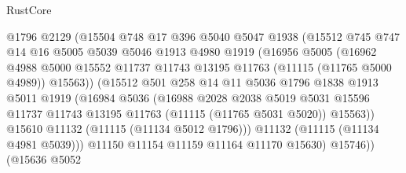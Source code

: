 \begin{lexlean}{RustCore}
\begin{coremodule}
                        @1796
                        @2129
                        (@15504
                          @748
                          @17
                          @396
                          @5040
                          @5047
                          @1938
                          (@15512
                            @745
                            @747
                            @14
                            @16
                            @5005
                            @5039
                            @5046
                            @1913
                            @4980
                            @1919
                            (@16956
                              @5005
                              (@16962
                                @4988
                                @5000
                                @15552
                                @11737
                                @11743
                                @13195
                                @11763
                                (@11115 (@11765 @5000 @4989))
                                @15563))
                            (@15512
                              @501
                              @258
                              @14
                              @11
                              @5036
                              @1796
                              @1838
                              @1913
                              @5011
                              @1919
                              (@16984
                                @5036
                                (@16988
                                  @2028
                                  @2038
                                  @5019
                                  @5031
                                  @15596
                                  @11737
                                  @11743
                                  @13195
                                  @11763
                                  (@11115 (@11765 @5031 @5020))
                                  @15563))
                              @15610
                              @11132
                              (@11115 (@11134 @5012 @1796)))
                            @11132
                            (@11115 (@11134 @4981 @5039)))
                          @11150
                          @11154
                          @11159
                          @11164
                          @11170
                          @15630)
                        @15746))
                    (@15636
                      @5052

\end{coremodule}
\end{lexlean}
